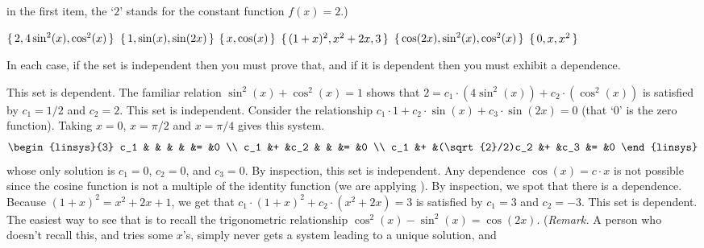 \begin{exercises}
     in the first item, 
     the `$2$' stands for the constant function $f(x)=2$.)
    \begin{exparts*}
      \partsitem \( \mbox{$\{\,2,4\sin^2(x),\cos^2(x)\,\}$} \)
      \partsitem \( \mbox{$\{\,1,\sin(x),\sin(2x)\,\}$} \)
      \partsitem \( \mbox{$\{\,x,\cos(x)\,\}$} \)
      \partsitem \( \mbox{$\{\,(1+x)^2,x^2+2x,3\,\}$} \)
      \partsitem \( \mbox{$\{\,\cos(2x),\sin^2(x),\cos^2(x)\,\}$} \)
      \partsitem \( \mbox{$\{\,0,x,x^2\,\}$} \)
    \end{exparts*}
    \begin{answer}
      In each case, if the set is independent then you must prove that, 
      and if it is
      dependent then you must exhibit a dependence.
      \begin{exparts}
        \partsitem This set is dependent.
          The familiar relation $\sin^2(x)+\cos^2(x)=1$ shows that
          $2=c_1\cdot(4\sin^2(x))+c_2\cdot(\cos^2(x))$ is satisfied by
          $c_1=1/2$ and $c_2=2$.
        \partsitem This set is independent.
          Consider the relationship
          $c_1\cdot 1+c_2\cdot\sin(x)+c_3\cdot\sin(2x)=0$
          (that `$0$' is the zero function).
          Taking $x=0$, $x=\pi/2$ and $x=\pi/4$ gives this system.
          \begin{equation*}
            \begin{linsys}{3}
               c_1  &   &                &   &      &=  &0  \\
               c_1  &+  &c_2             &   &      &=  &0  \\
               c_1  &+  &(\sqrt{2}/2)c_2 &+  &c_3   &=  &0  
            \end{linsys}
          \end{equation*}
          whose only solution is 
          $c_1=0$, $c_2=0$, and $c_3=0$. 
        \partsitem By inspection, this set is independent.
          Any dependence $\cos(x)=c\cdot x$ is not possible since the cosine
          function is not a multiple of the identity function
          (we are applying ).
        \partsitem By inspection, we spot that there is a dependence.
          Because $(1+x)^2=x^2+2x+1$, we get that
          $c_1\cdot(1+x)^2+c_2\cdot(x^2+2x)=3$ is satisfied by 
          $c_1=3$ and $c_2=-3$.
        \partsitem This set is dependent.
          The easiest way to see that is to recall the trigonometric
          relationship $\cos^2(x)-\sin^2(x)=\cos(2x)$.
          (\textit{Remark.} 
          A person who doesn't recall this, and tries some $x$'s,
          simply never gets a system leading to a unique solution, and

\end{exparts}
\end{answer}
\end{exercises}

